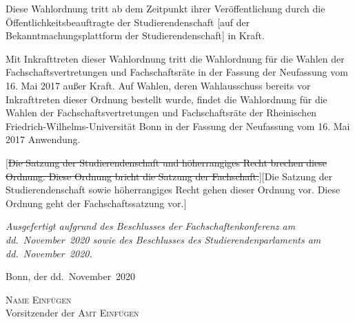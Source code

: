 \documentclass[%
draft,%
multilinesections%
]{fswo}
\newcommand\oldT[1]  {{\color{Gray}[\st{#1}]}}
\newcommand\newT[1]  {{\color{Green}[#1]}}
\newcommand\oldT[1]{}%
\newcommand\newT[1]{#1}
\newcommand\change[2]{\oldT{#1}\newT{#2}}
\begin{document}
\begin{contract}
Diese Wahlordnung tritt ab dem Zeitpunkt ihrer Veröffentlichung durch die Öffentlichkeitsbeauftragte der Studierendenschaft \newT{auf der Bekanntmachungsplattform der Studierendenschaft} in Kraft.

Mit Inkrafttreten dieser Wahlordnung tritt die Wahlordnung für die Wahlen der Fachschaftsvertretungen und Fachschaftsräte in der Fassung der Neufassung vom 16. Mai 2017 außer Kraft.
Auf Wahlen, deren Wahlausschuss bereits vor Inkrafttreten dieser Ordnung bestellt wurde, findet die Wahlordnung für die Wahlen der Fachschaftsvertretungen und Fachschaftsräte der Rheinischen Friedrich-Wilhelms-Universität Bonn in der Fassung der Neufassung vom 16. Mai 2017 Anwendung.

\change{Die Satzung der Studierendenschaft und höherrangiges Recht brechen diese Ordnung.
Diese Ordnung bricht die Satzung der Fachschaft.}{Die Satzung der Studierendenschaft sowie höherrangiges Recht gehen dieser Ordnung vor. Diese Ordnung geht der Fachschaftssatzung vor.}
\end{contract}


\vspace{2em}
{\itshape%
Ausgefertigt aufgrund des Beschlusses der Fachschaftenkonferenz am dd.~November~2020 sowie des Beschlusses des Studierendenparlaments am dd.~November~2020.

Bonn, der dd.~November~2020}
\vspace{1em}
\begin{center}
\textsc{Name Einfügen}\\
Vorsitzender der \textsc{Amt Einfügen}
\end{center}
\end{document}
